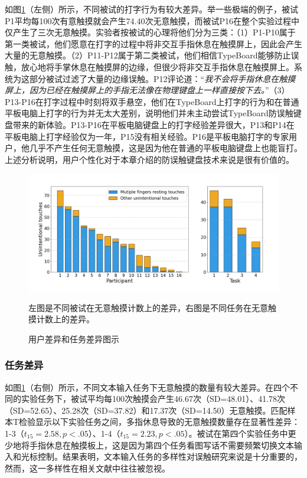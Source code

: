 如图\ref{fig:TypeBoard_u_touches_over_user_task}（左侧）所示，不同被试的打字行为有较大差异。举一些极端的例子，被试P1平均每100次有意触摸就会产生74.40次无意触摸，而被试P16在整个实验过程中仅产生了三次无意触摸。实验者按被试的心理将他们分为三类：（1）P1-P10属于第一类被试，他们愿意在打字的过程中将非交互手指休息在触摸屏上，因此会产生大量的无意触摸。（2）P11-P12属于第二类被试，他们相信TypeBoard能够防止误触，放心地将手掌休息在触摸屏的边缘，但很少将非交互手指休息在触摸屏上。系统为这部分被试过滤了大量的边缘误触。P12评论道：“\emph{我不会将手指休息在触摸屏上，因为已经在触摸屏上的手指无法像在物理键盘上一样直接按下去。}”（3）P13-P16在打字过程中时刻将双手悬空，他们在TypeBoard上打字的行为和在普通平板电脑上打字的行为并无太大差别，说明他们并未主动尝试TypeBoard防误触键盘带来的新体验。P13-P16在平板电脑键盘上的打字经验差异很大，P13和P14在平板电脑上打字经验仅为一年，P15没有相关经验。P16是平板电脑打字的专家用户，他几乎不产生任何无意触摸，这是因为他在普通的平板电脑键盘上也能盲打。上述分析说明，用户个性化对于本章介绍的防误触键盘技术来说是很有价值的。

\begin{figure}[!tbh]
	\includegraphics[width=1.0\linewidth]{figures/TypeBoard_u_touches_over_user_task.png}
	\centering
	\caption*{左图是不同被试在无意触摸计数上的差异，右图是不同任务在无意触摸计数上的差异。}
	\caption{用户差异和任务差异图示}
	\label{fig:TypeBoard_u_touches_over_user_task}
\end{figure}

\subsubsection{任务差异}

如图\ref{fig:TypeBoard_u_touches_over_user_task}（右侧）所示，不同文本输入任务下无意触摸的数量有较大差异。在四个不同的实验任务下，被试平均每100次触摸会产生46.67次（SD=48.01）、41.78次（SD=52.65）、25.28次（SD=37.82）和17.37次（SD=14.50）无意触摸。匹配样本T检验显示以下实验任务之间，多指休息导致的无意触摸数量存在显著性差异：1-3（$t_{15}=2.58,p<.05$）、1-4（$t_{15}=2.23,p<.05$）。被试在第四个实验任务中更少地将手指休息在触摸板上，这是因为第四个任务看图写话不需要频繁切换文本输入和光标控制。结果表明，文本输入任务的多样性对误触研究来说是十分重要的，然而，这一多样性在相关文献中往往被忽视\cite{2013-TapBoard, 2020-TabletopTouch, 2014-PalmRejection}。

